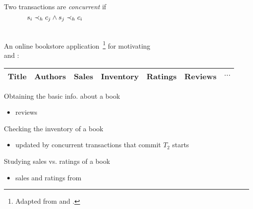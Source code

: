 \appendix

\begin{frame}{}
  \begin{columns}
      Two transactions are \emph{concurrent} if
      \[
	s_i \prec_{h} c_j \land s_j \prec_{h} c_i
      \]
  \end{columns}
\end{frame}

\begin{frame}{}
  \begin{center}
    An online bookstore application~\footnote{Adapted from  
    and .} for motivating \\
     and :
  \end{center}

  \vspace{-0.20cm}
  \begin{table}
    \centering
    \begin{tabular}{c|c|c|c|c|c|c}
      \hline
      Title & Authors & Sales & Inventory & Ratings & Reviews & $\cdots$ \\
      \hline
    \end{tabular}
  \end{table}

  \vspace{0.20cm}
  \begin{description}
    \setlength{\itemsep}{6pt}
    \item[Customer ($T_1$):] Obtaining the basic info. about a book
      \begin{itemize}
	\item \emph{} reviews
      \end{itemize}
      \pause
    \item[Bookstore Clerk ($T_2$):] Checking the inventory of a book
      \begin{itemize}
	\item updated by concurrent transactions that commit \emph{} $T_2$ starts
      \end{itemize}
      \pause
    \item[Sales Analyst ($T_3$):] Studying sales vs. ratings of a book
      \begin{itemize}
	\item sales and ratings from \emph{}
      \end{itemize}
  \end{description}
\end{frame}

